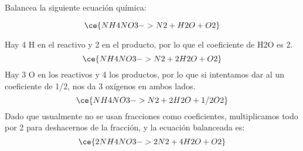 Balancea la siguiente ecuación química:

\[
    \ce{NH4NO3 -> N2 + H2O + O2}
\]

\begin{solutionbox}{5.5cm}
    Hay 4 H en el reactivo y 2 en el producto, por lo que el coeficiente de H2O es 2.
    \[
        \ce{NH4NO3 -> N2 + 2H2O + O2}
    \]
    Hay 3 O en los reactivos y 4 los productos, por lo que si intentamos dar al  un coeficiente de 1/2, nos da 3 oxígenos en ambos lados.
    \[
        \ce{NH4NO3 -> N2 + 2H2O + 1/2O2}
    \]
    Dado que usualmente no se usan fracciones como coeficientes, multiplicamos todo por 2 para deshacernos de la fracción, y la ecuación balanceada es:
    \[
        \ce{2NH4NO3 -> 2N2 + 4H2O + O2}
    \]
\end{solutionbox}